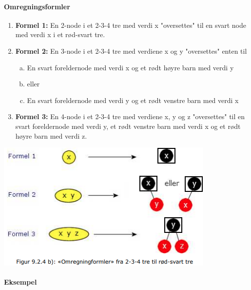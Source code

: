 \documentclass[11pt]{article}
\begin{document}
        \paragraph{Omregningsformler}
        \begin{multicols}{2}
            \begin{enumerate}
                \item \textbf{Formel 1:} En 2-node i et 2-3-4 tre med verdi x "oversettes" til en svart node med verdi
                    x i et rød-svart tre.
                \item \textbf{Formel 2:} En 3-node i et 2-3-4 tre med verdiene x og y "oversettes" enten til
                    \begin{enumerate}[a), itemsep=0.5mm]
                        \item En svart foreldernode med verdi x og et rødt høyre barn med verdi y
                        \item[] eller
                        \item En svart foreldernode med verdi y og et rødt venstre barn med verdi x
                    \end{enumerate}
                \item \textbf{Formel 3:} En 4-node i et 2-3-4 tre med verdiene x, y og z "oversettes" til en svart
                    foreldernode med verdi y, et rødt venstre barn med verdi x og et rødt høyre barn med
                    verdi z.
            \end{enumerate}
            \columnbreak
            \includegraphics[scale=0.9]{figur-9.2.4b.png}
        \end{multicols}

\newpage

        \paragraph{Eksempel}
\end{document}
